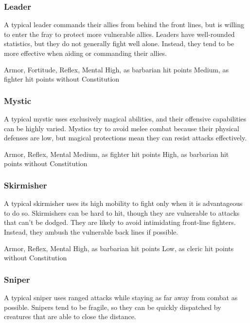     \subsubsection{Leader}
      A typical leader commands their allies from behind the front lines, but is willing to enter the fray to protect more vulnerable allies.
      Leaders have well-rounded statistics, but they do not generally fight well alone.
      Instead, they tend to be more effective when aiding or commanding their allies.

        Armor,  Fortitude,  Reflex,  Mental
       High, as barbarian hit points
       Medium, as fighter hit points without Constitution

    \subsubsection{Mystic}
      A typical mystic uses exclusively magical abilities, and their offensive capabilities can be highly varied.
      Mystics try to avoid melee combat because their physical defenses are low, but magical protections mean they can resist attacks effectively.

        Armor,  Reflex,  Mental
       Medium, as fighter hit points
       High, as barbarian hit points without Constitution

    \subsubsection{Skirmisher}
      A typical skirmisher uses its high mobility to fight only when it is advantageous to do so.
      Skirmishers can be hard to hit, though they are vulnerable to attacks that can't be dodged.
      They are likely to avoid intimidating front-line fighters.
      Instead, they ambush the vulnerable back lines if possible.

        Armor,  Reflex,  Mental
       High, as barbarian hit points
       Low, as cleric hit points without Constitution

    \subsubsection{Sniper}
      A typical sniper uses ranged attacks while staying as far away from combat as possible.
      Snipers tend to be fragile, so they can be quickly dispatched by creatures that are able to close the distance.

